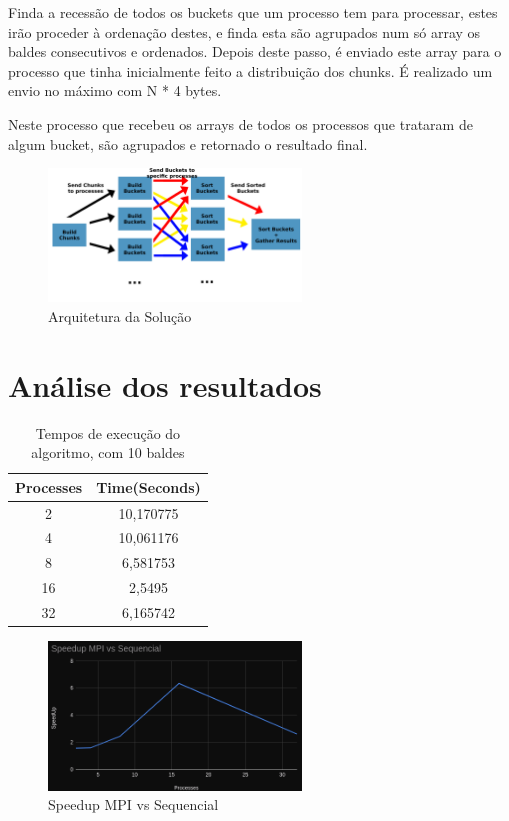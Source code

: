\documentclass[a4paper]{report}
\begin{document}
Finda a recessão de todos os buckets que um processo tem para processar, estes
irão proceder à ordenação destes, e finda esta são agrupados num só array os
baldes consecutivos e ordenados. Depois deste passo, é enviado este array para o
processo que tinha inicialmente feito a distribuição dos chunks. É realizado um
envio no máximo com N * 4 bytes.

Neste processo que recebeu os arrays de todos os processos que trataram de algum
bucket, são agrupados e retornado o resultado final.

\begin{figure}[h]
    \centering
    \includegraphics[width=0.6\textwidth]{images/esquemas/algoritmo_graph2.png}
    \caption{Arquitetura da Solução}
\end{figure}

\pagebreak
\section{Análise dos resultados}
\begin{table}[h]
    \centering
    \begin{tabular}{|c|c|}
        \hline
        Processes & Time(Seconds) \\ \hline
        2         & 10,170775     \\ \hline
        4         & 10,061176     \\ \hline
        8         & 6,581753      \\ \hline
        16        & 2,5495        \\ \hline
        32        & 6,165742      \\ \hline
    \end{tabular}
    \caption{\label{tab:Times}Tempos de execução do algoritmo, com 10 baldes}
\end{table}
\begin{figure}[h]
    \centering
    \includegraphics[width=0.6\textwidth]{images/speedupseq.jpeg}
    \caption{Speedup MPI vs Sequencial}
    \label{img:smpi}
\end{figure}
\end{document}
